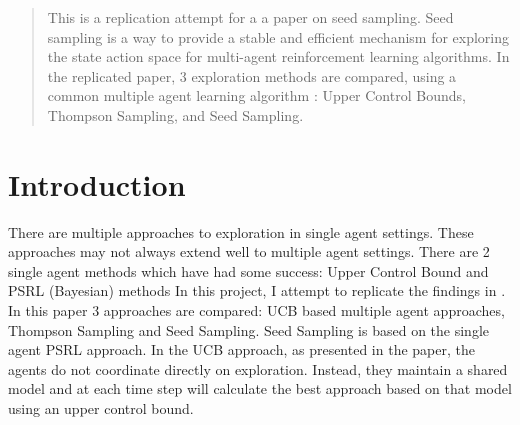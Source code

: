\documentclass{article}
\begin{document}



\printAffiliationsAndNotice{} 

\begin{abstract}
This is a replication attempt for a a paper on seed sampling. Seed sampling is a way to provide a stable and efficient mechanism for exploring the state action space for multi-agent reinforcement learning algorithms. In the replicated paper, 3 exploration methods are compared, using a common multiple agent learning algorithm : Upper Control Bounds,  Thompson Sampling, and Seed Sampling.

\end{abstract}

\vskip 1.0in
\section{Introduction}
There are multiple approaches to exploration in single agent settings. These approaches may not always extend well to multiple agent settings. There are 2 single agent methods which have had some success: Upper Control Bound \cite{UCB2010} and PSRL (Bayesian) methods \cite{Strens2000}
In this project, I attempt to replicate the findings in \cite{SeedSampling}. In this paper 3 approaches are compared: UCB based multiple agent approaches, Thompson Sampling and Seed Sampling. Seed Sampling is based on the single agent PSRL approach.  In the UCB approach, as presented in the paper, the agents do not coordinate directly on exploration. Instead, they maintain a shared model and at each time step will calculate the best approach based on that model using an upper control bound. 
\end{document}
